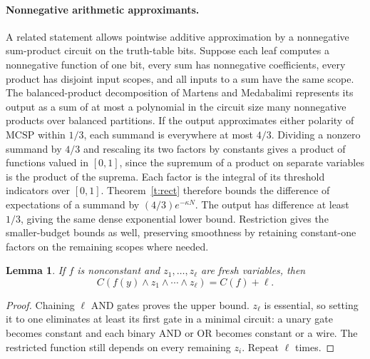 \documentclass[11pt]{article}
\newtheorem{lemma}[theorem]{Lemma}
\newcommand{\mc}{\mathrm{MCSP}}
\begin{document}
\paragraph{Nonnegative arithmetic approximants.}
A related statement allows pointwise additive approximation by a nonnegative sum-product circuit on the truth-table bits. Suppose each leaf computes a nonnegative function of one bit, every sum has nonnegative coefficients, every product has disjoint input scopes, and all inputs to a sum have the same scope. The balanced-product decomposition of Martens and Medabalimi \cite[Theorem~38]{mm} represents its output as a sum of at most a polynomial in the circuit size many nonnegative products over balanced partitions. If the output approximates either polarity of $\mc$ within $1/3$, each summand is everywhere at most $4/3$. Dividing a nonzero summand by $4/3$ and rescaling its two factors by constants gives a product of functions valued in $[0,1]$, since the supremum of a product on separate variables is the product of the suprema. Each factor is the integral of its threshold indicators over $[0,1]$. Theorem~\ref{t:rect} therefore bounds the difference of expectations of a summand by $(4/3)e^{-\kappa N}$. The output has difference at least $1/3$, giving the same dense exponential lower bound. Restriction gives the smaller-budget bounds as well, preserving smoothness by retaining constant-one factors on the remaining scopes where needed.

\begin{lemma}\label{l:guard}
If $f$ is nonconstant and $z_1,\ldots,z_\ell$ are fresh variables, then
\[
 C(f(y)\wedge z_1\wedge\cdots\wedge z_\ell)=C(f)+\ell.
\]
\end{lemma}
\begin{proof}
Chaining $\ell$ AND gates proves the upper bound. $z_\ell$ is essential, so setting it to one eliminates at least its first gate in a minimal circuit: a unary gate becomes constant and each binary AND or OR becomes constant or a wire. The restricted function still depends on every remaining $z_i$. Repeat $\ell$ times.
\end{proof}
\end{document}
